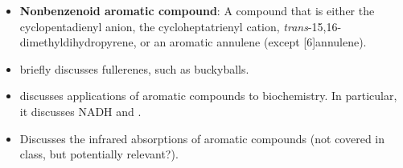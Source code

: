 \documentclass[../notes.tex]{subfiles}
\begin{document}
\begin{itemize}
    \item \textbf{Nonbenzenoid aromatic compound}: A compound that is either the cyclopentadienyl anion, the cycloheptatrienyl cation, \emph{trans}-15,16-dimethyldihydropyrene, or an aromatic annulene (except [6]annulene).
    \item \textcite{bib:SolomonsEtAl} briefly discusses fullerenes, such as buckyballs.
    \item \textcite{bib:SolomonsEtAl} discusses applications of aromatic compounds to biochemistry. In particular, it discusses NADH and .
    \item Discusses the infrared absorptions of aromatic compounds (not covered in class, but potentially relevant?).
\end{itemize}
\end{document}
